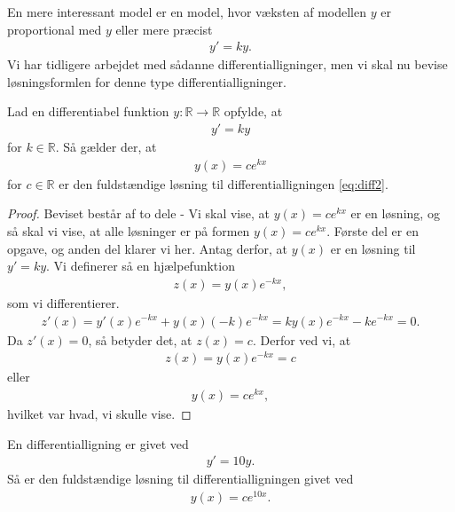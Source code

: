 En mere interessant model er en model, hvor væksten af modellen $y$ er proportional med $y$ eller mere præcist
\begin{align*}
	y' = ky.
\end{align*}
Vi har tidligere arbejdet med sådanne differentialligninger, men vi skal nu bevise løsningsformlen for denne type differentialligninger. 
\begin{setn}\label{setn:2}
	Lad en differentiabel funktion $y:\mathbb{R} \to \mathbb{R}$ opfylde, at
	\begin{align}\label{eq:diff2}
		y' = ky
	\end{align}
	for $k \in \mathbb{R}$. Så gælder der, at 
	\begin{align*}
		y(x) = ce^{kx}
	\end{align*}
	for $c\in \mathbb{R}$ er den fuldstændige løsning til differentialligningen \eqref{eq:diff2}.
\end{setn}
\begin{proof}
	Beviset består af to dele - Vi skal vise, at $y(x) = ce^{kx}$ er en løsning, og så skal vi vise, at alle løsninger er på formen $y(x) = ce^{kx}$. Første del er en opgave,
	og anden del klarer vi her. 
	Antag derfor, at $y(x)$ er en løsning til $y' = ky$. Vi definerer så en hjælpefunktion
	\begin{align*}
		z(x) = y(x)e^{-kx},
	\end{align*}
	som vi differentierer.
	\begin{align*}
		z'(x) = y'(x)e^{-kx}+y(x)(-k)e^{-kx} = ky(x)e^{-kx}-ke^{-kx}=0.
	\end{align*}
	Da $z'(x)=0$, så betyder det, at $z(x) = c$. Derfor ved vi, at
	\begin{align*}
		z(x) = y(x)e^{-kx} = c
	\end{align*}
	eller 
	\begin{align*}
		y(x) = ce^{kx},
	\end{align*}
	hvilket var hvad, vi skulle vise. 		 
\end{proof}

\begin{exa}
	En differentialligning er givet ved 
	\begin{align*}
		y' = 10y.
	\end{align*}
	Så er den fuldstændige løsning til differentialligningen givet ved
	\begin{align*}
		y(x) = ce^{10x}.
	\end{align*}
\end{exa}

